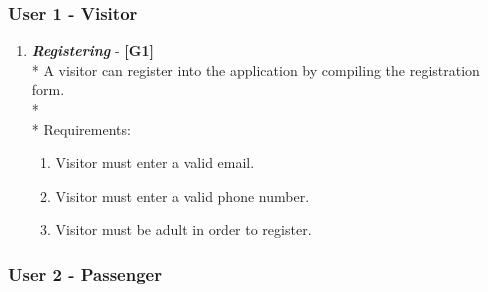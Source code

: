 \documentclass{article}
\begin{document}
\subsubsection{User 1 - Visitor}
\begin{enumerate}
\item \textit{\textbf{Registering}} - \textbf{[G1]}\\*
A visitor can register into the application by compiling the registration form.\\*\\*
Requirements:
\begin{enumerate}
\item Visitor must enter a valid email.
\item Visitor must enter a valid phone number.
\item Visitor must be adult in order to register.
\end{enumerate}
\end{enumerate}

\subsubsection{User 2 - Passenger}
\end{document}
